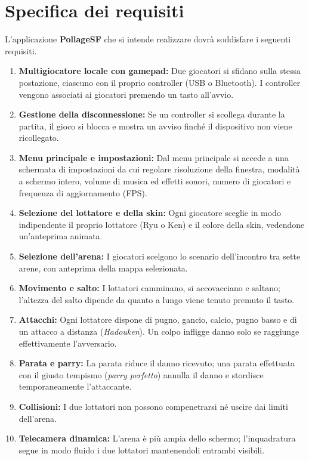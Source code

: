 \documentclass[11pt, a4paper]{article}
\begin{document}
	\section{Specifica dei requisiti}
	L'applicazione \textbf{PollageSF} che si intende realizzare dovrà soddisfare i seguenti requisiti.
	
	\begin{enumerate}
		\item \textbf{Multigiocatore locale con gamepad:} Due giocatori si sfidano sulla stessa postazione, ciascuno con il proprio controller (USB o Bluetooth). I controller vengono associati ai giocatori premendo un tasto all'avvio.
		\item \textbf{Gestione della disconnessione:} Se un controller si scollega durante la partita, il gioco si blocca e mostra un avviso finché il dispositivo non viene ricollegato.
		\item \textbf{Menu principale e impostazioni:} Dal menu principale si accede a una schermata di impostazioni da cui regolare risoluzione della finestra, modalità a schermo intero, volume di musica ed effetti sonori, numero di giocatori e frequenza di aggiornamento (FPS).
		\item \textbf{Selezione del lottatore e della skin:} Ogni giocatore sceglie in modo indipendente il proprio lottatore (Ryu o Ken) e il colore della skin, vedendone un'anteprima animata.
		\item \textbf{Selezione dell'arena:} I giocatori scelgono lo scenario dell'incontro tra sette arene, con anteprima della mappa selezionata.
		\item \textbf{Movimento e salto:} I lottatori camminano, si accovacciano e saltano; l'altezza del salto dipende da quanto a lungo viene tenuto premuto il tasto.
		\item \textbf{Attacchi:} Ogni lottatore dispone di pugno, gancio, calcio, pugno basso e di un attacco a distanza (\emph{Hadouken}). Un colpo infligge danno solo se raggiunge effettivamente l'avversario.
		\item \textbf{Parata e parry:} La parata riduce il danno ricevuto; una parata effettuata con il giusto tempismo (\emph{parry perfetto}) annulla il danno e stordisce temporaneamente l'attaccante.
		\item \textbf{Collisioni:} I due lottatori non possono compenetrarsi né uscire dai limiti dell'arena.
		\item \textbf{Telecamera dinamica:} L'arena è più ampia dello schermo; l'inquadratura segue in modo fluido i due lottatori mantenendoli entrambi visibili.

\end{enumerate}
\end{document}
